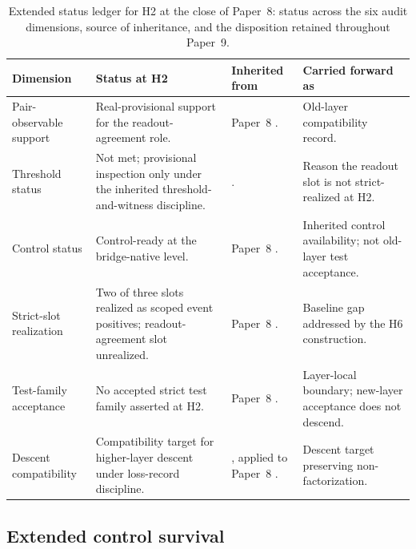 \documentclass[11pt]{article}
\newcommand{\OldLayer}{H2}
\newcommand{\NewLayer}{H6}
\newcommand{\PaperNine}{Paper~9}
\newcommand{\PaperEight}{Paper~8}
\theoremstyle{definition}
\begin{document}
\begin{table}[tbp]
\centering
\footnotesize
\caption{Extended status ledger for \OldLayer{} at the close of \PaperEight{}:
status across the six audit dimensions, source of inheritance, and the
disposition retained throughout \PaperNine{}.}
\label{tab:extended-h2-status}
\begin{tabularx}{\textwidth}{@{}>{\raggedright\arraybackslash}p{}>{\raggedright\arraybackslash}X>{\raggedright\arraybackslash}p{}>{\raggedright\arraybackslash}X@{}}
\toprule
Dimension & Status at \OldLayer{} & Inherited from & Carried forward as \\
\midrule
Pair-observable support
  & Real-provisional support for the readout-agreement role.
  & \PaperEight{} \cite{Tsiokos2026CarrierToEvent}.
  & Old-layer compatibility record. \\
Threshold status
  & Not met; provisional inspection only under the inherited threshold-and-witness discipline.
  & \cite{Tsiokos2026FoundationsII,Tsiokos2026CarrierToEvent}.
  & Reason the readout slot is not strict-realized at \OldLayer{}. \\
Control status
  & Control-ready at the bridge-native level.
  & \PaperEight{} \cite{Tsiokos2026CarrierToEvent}.
  & Inherited control availability; not old-layer test acceptance. \\
Strict-slot realization
  & Two of three slots realized as scoped event positives; readout-agreement slot unrealized.
  & \PaperEight{} \cite{Tsiokos2026CarrierToEvent}.
  & Baseline gap addressed by the \NewLayer{} construction. \\
Test-family acceptance
  & No accepted strict test family asserted at \OldLayer{}.
  & \PaperEight{} \cite{Tsiokos2026CarrierToEvent}.
  & Layer-local boundary; new-layer acceptance does not descend. \\
Descent compatibility
  & Compatibility target for higher-layer descent under loss-record discipline.
  & \cite{Tsiokos2026FoundationsII}, applied to \PaperEight{} \cite{Tsiokos2026CarrierToEvent}.
  & Descent target preserving non-factorization. \\
\bottomrule
\end{tabularx}
\end{table}

\subsection{Extended control survival}\label{subsec:extended-table-control-survival}
\end{document}
